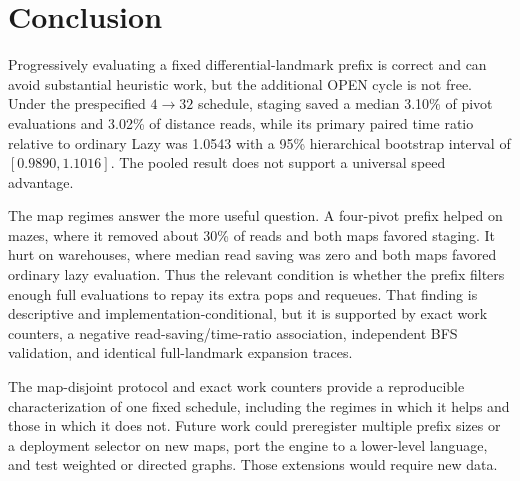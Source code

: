 \section{Conclusion}
\label{sec:conclusion}

Progressively evaluating a fixed differential-landmark prefix is correct and
can avoid substantial heuristic work, but the additional OPEN cycle is not
free.  Under the prespecified $4\rightarrow32$ schedule, staging saved a median
3.10\% of pivot evaluations and 3.02\% of distance reads, while its primary
paired time ratio relative to ordinary Lazy \Astar{} was 1.0543 with a 95\%
hierarchical bootstrap interval of $[0.9890,1.1016]$.  The pooled result does
not support a universal speed advantage.

The map regimes answer the more useful question.  A four-pivot prefix helped
on mazes, where it removed about 30\% of reads and both maps favored staging.
It hurt on warehouses, where median read saving was zero and both maps favored
ordinary lazy evaluation.  Thus the relevant condition is whether the prefix
filters enough full evaluations to repay its extra pops and requeues.  That
finding is descriptive and implementation-conditional, but it is supported by
exact work counters, a negative read-saving/time-ratio association, independent
BFS validation, and identical full-landmark expansion traces.

The map-disjoint protocol and exact work counters provide a reproducible
characterization of one fixed schedule, including the regimes in which it
helps and those in which it does not.  Future work could preregister multiple
prefix sizes or a deployment selector on new maps, port the engine to a
lower-level language, and test weighted or directed graphs.  Those extensions
would require new data.
